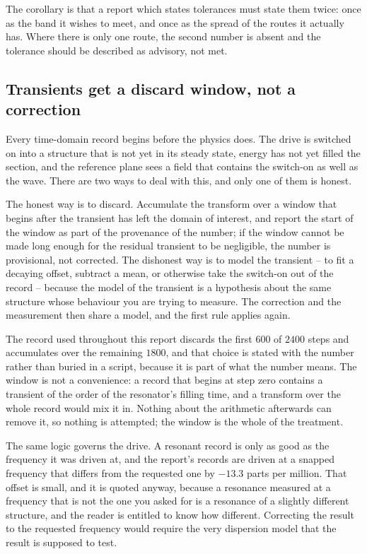The corollary is that a report which states tolerances must state them twice: once as the band it wishes to
meet, and once as the spread of the routes it actually has. Where there is only one route, the second number is
absent and the tolerance should be described as advisory, not met.

\subsection{Transients get a discard window, not a correction}
\label{sec:method-transients}

Every time-domain record begins before the physics does. The drive is switched on into a structure that is not
yet in its steady state, energy has not yet filled the section, and the reference plane sees a field that
contains the switch-on as well as the wave. There are two ways to deal with this, and only one of them is
honest.

The honest way is to discard. Accumulate the transform over a window that begins after the transient has left
the domain of interest, and report the start of the window as part of the provenance of the number; if the
window cannot be made long enough for the residual transient to be negligible, the number is provisional, not
corrected. The dishonest way is to model the transient -- to fit a decaying offset, subtract a mean, or
otherwise take the switch-on out of the record -- because the model of the transient is a hypothesis about the
same structure whose behaviour you are trying to measure. The correction and the measurement then share a
model, and the first rule applies again.

The record used throughout this report discards the first $600$ of $2400$ steps and accumulates over the
remaining $1800$, and that choice is stated with the number rather than buried in a script, because it is part
of what the number means. The window is not a convenience: a record that begins at step zero contains a
transient of the order of the resonator's filling time, and a transform over the whole record would mix it in.
Nothing about the arithmetic afterwards can remove it, so nothing is attempted; the window is the whole of the
treatment.

The same logic governs the drive. A resonant record is only as good as the frequency it was driven at, and the
report's records are driven at a snapped frequency that differs from the requested one by $-13.3$ parts per
million. That offset is small, and it is quoted anyway, because a resonance measured at a frequency that is not
the one you asked for is a resonance of a slightly different structure, and the reader is entitled to know how
different. Correcting the result to the requested frequency would require the very dispersion model that the
result is supposed to test.

